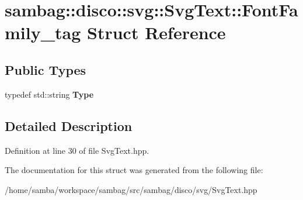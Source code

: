 \hypertarget{structsambag_1_1disco_1_1svg_1_1_svg_text_1_1_font_family__tag}{
\section{sambag::disco::svg::SvgText::FontFamily\_\-tag Struct Reference}
\label{structsambag_1_1disco_1_1svg_1_1_svg_text_1_1_font_family__tag}
}
\subsection*{Public Types}
\begin{DoxyCompactItemize}
\item 
\hypertarget{structsambag_1_1disco_1_1svg_1_1_svg_text_1_1_font_family__tag_a7333df9555a4f097dfe672b2a7034f9f}{
typedef std::string {\bfseries Type}}
\label{structsambag_1_1disco_1_1svg_1_1_svg_text_1_1_font_family__tag_a7333df9555a4f097dfe672b2a7034f9f}

\end{DoxyCompactItemize}


\subsection{Detailed Description}


Definition at line 30 of file SvgText.hpp.



The documentation for this struct was generated from the following file:\begin{DoxyCompactItemize}
\item 
/home/samba/workspace/sambag/src/sambag/disco/svg/SvgText.hpp\end{DoxyCompactItemize}
